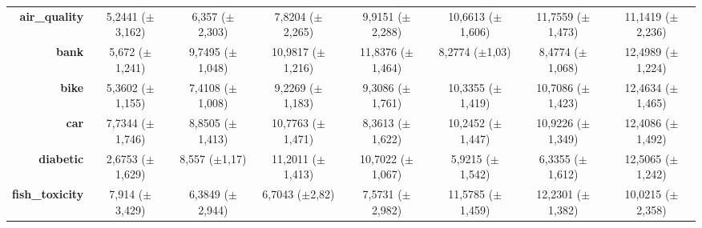 \documentclass[preprint,review,12pt]{elsarticle}
\begin{document}
\begin{table}[htb]
{\begin{tabular}{r|c|c|ccccc|}
			\textbf{air\_quality}         & \cellcolor[rgb]{ .765,  .851,  .502}5,2441 ($\pm$3,162)                           & \cellcolor[rgb]{ 1,  .922,  .518}6,357 ($\pm$2,303)     & \cellcolor[rgb]{ .996,  .784,  .494}7,8204 ($\pm$2,265)  & \cellcolor[rgb]{ .984,  .588,  .455}9,9151 ($\pm$2,288)  & \cellcolor[rgb]{ .98,  .518,  .443}10,6613 ($\pm$1,606)  & \cellcolor[rgb]{ .973,  .412,  .42}11,7559 ($\pm$1,473)  & \cellcolor[rgb]{ .976,  .471,  .431}11,1419 ($\pm$2,236) \\
			\textbf{bank}                 & \cellcolor[rgb]{ .914,  .894,  .51}5,672 ($\pm$1,241)                             & \cellcolor[rgb]{ .988,  .639,  .463}9,7495 ($\pm$1,048) & \cellcolor[rgb]{ .98,  .537,  .447}10,9817 ($\pm$1,216)  & \cellcolor[rgb]{ .976,  .467,  .431}11,8376 ($\pm$1,464) & \cellcolor[rgb]{ .992,  .757,  .486}8,2774 ($\pm$1,03)   & \cellcolor[rgb]{ .992,  .741,  .486}8,4774 ($\pm$1,068)  & \cellcolor[rgb]{ .973,  .412,  .42}12,4989 ($\pm$1,224)  \\
			\textbf{bike}                 & \cellcolor[rgb]{ .859,  .878,  .506}5,3602 ($\pm$1,155)                           & \cellcolor[rgb]{ .996,  .843,  .506}7,4108 ($\pm$1,008) & \cellcolor[rgb]{ .988,  .686,  .475}9,2269 ($\pm$1,183)  & \cellcolor[rgb]{ .988,  .682,  .475}9,3086 ($\pm$1,761)  & \cellcolor[rgb]{ .984,  .596,  .455}10,3355 ($\pm$1,419) & \cellcolor[rgb]{ .984,  .561,  .451}10,7086 ($\pm$1,423) & \cellcolor[rgb]{ .973,  .412,  .42}12,4634 ($\pm$1,465)  \\
			\textbf{car}                  & \cellcolor[rgb]{ 1,  .922,  .518}7,7344 ($\pm$1,746)                              & \cellcolor[rgb]{ .996,  .8,  .498}8,8505 ($\pm$1,413)   & \cellcolor[rgb]{ .984,  .592,  .455}10,7763 ($\pm$1,471) & \cellcolor[rgb]{ 1,  .855,  .506}8,3613 ($\pm$1,622)     & \cellcolor[rgb]{ .988,  .651,  .467}10,2452 ($\pm$1,447) & \cellcolor[rgb]{ .984,  .576,  .451}10,9226 ($\pm$1,349) & \cellcolor[rgb]{ .973,  .412,  .42}12,4086 ($\pm$1,492)  \\
			\textbf{diabetic}             & \cellcolor[rgb]{ .494,  .773,  .486}2,6753 ($\pm$1,629)                           & \cellcolor[rgb]{ .992,  .765,  .49}8,557 ($\pm$1,17)    & \cellcolor[rgb]{ .98,  .529,  .443}11,2011 ($\pm$1,413)  & \cellcolor[rgb]{ .984,  .573,  .451}10,7022 ($\pm$1,067) & \cellcolor[rgb]{ .898,  .89,  .51}5,9215 ($\pm$1,542)    & \cellcolor[rgb]{ .949,  .906,  .514}6,3355 ($\pm$1,612)  & \cellcolor[rgb]{ .973,  .412,  .42}12,5065 ($\pm$1,242)  \\
			\textbf{fish\_toxicity}       & \cellcolor[rgb]{ .996,  .788,  .494}7,914 ($\pm$3,429)                            & \cellcolor[rgb]{ 1,  .922,  .518}6,3849 ($\pm$2,944)    & \cellcolor[rgb]{ 1,  .894,  .514}6,7043 ($\pm$2,82)      & \cellcolor[rgb]{ .996,  .82,  .498}7,5731 ($\pm$2,982)   & \cellcolor[rgb]{ .976,  .471,  .431}11,5785 ($\pm$1,459) & \cellcolor[rgb]{ .973,  .412,  .42}12,2301 ($\pm$1,382)  & \cellcolor[rgb]{ .984,  .608,  .459}10,0215 ($\pm$2,358) \\

\end{tabular}}
\end{table}
\end{document}
